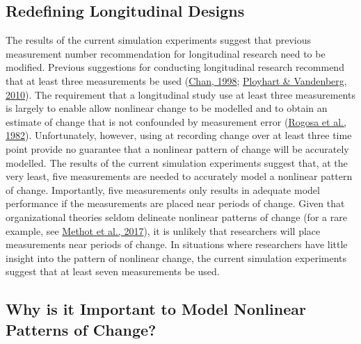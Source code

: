\documentclass[
12pt, %
twoside,
english]{guelphthesis}
\begin{document}
\hypertarget{redefining-longitudinal-designs}{%
\subsection{Redefining Longitudinal Designs}\label{redefining-longitudinal-designs}}

The results of the current simulation experiments suggest that previous measurement number recommendation for longitudinal research need to be modified. Previous suggestions for conducting longitudinal research recommend that at least three measurements be used (\protect\hyperlink{ref-chan1998}{Chan, 1998}; \protect\hyperlink{ref-ployhart2010}{Ployhart \& Vandenberg, 2010}). The requirement that a longitudinal study use at least three measurements is largely to enable allow nonlinear change to be modelled and to obtain an estimate of change that is not confounded by measurement error (\protect\hyperlink{ref-rogosa1982}{Rogosa et al., 1982}). Unfortunately, however, using at recording change over at least three time point provide no guarantee that a nonlinear pattern of change will be accurately modelled. The results of the current simulation experiments suggest that, at the very least, five measurements are needed to accurately model a nonlinear pattern of change. Importantly, five measurements only results in adequate model performance if the measurements are placed near periods of change. Given that organizational theories seldom delineate nonlinear patterns of change (for a rare example, see \protect\hyperlink{ref-methot2017}{Methot et al., 2017}), it is unlikely that researchers will place measurements near periods of change. In situations where researchers have little insight into the pattern of nonlinear change, the current simulation experiments suggest that at least seven measurements be used.

\hypertarget{why-is-it-important-to-model-nonlinear-patterns-of-change}{%
\subsection{Why is it Important to Model Nonlinear Patterns of Change?}\label{why-is-it-important-to-model-nonlinear-patterns-of-change}}
\end{document}
